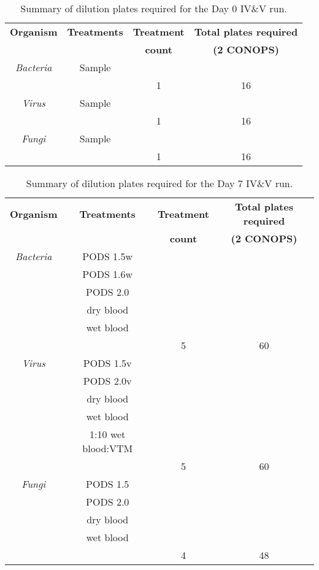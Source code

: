 \documentclass{article}
\begin{document}
\begin{table}
  \centering
  \begin{tabular}[]{c|c|c|c}
    \textbf{Organism} & \textbf{Treatments} & \textbf{Treatment} & \textbf{Total plates required} \\
     &  & \textbf{count} & \textbf{(2 CONOPS)} \\
    \hline
    \textit{Bacteria} & Sample  & & \\
    \hline
    & & 1 & 16\\
    \hline
    \textit{Virus} & Sample  & & \\
    \hline
    & & 1 & 16\\
    \hline
    \textit{Fungi} & Sample  & & \\
    \hline
    & & 1 & 16\\
    \hline

  \end{tabular}
  \caption{Summary of dilution plates required for the Day 0 IV\&V run.}
  \label{tab:dilution-plan-day-0}
\end{table}


\begin{table}
  \centering
  \begin{tabular}[]{c|c|c|c}
    \textbf{Organism} & \textbf{Treatments} & \textbf{Treatment} & \textbf{Total plates required} \\
     &  & \textbf{count} & \textbf{(2 CONOPS)} \\
    \hline
    \textit{Bacteria} & PODS 1.5w  & & \\
     & PODS 1.6w  & & \\
     & PODS 2.0  & & \\
     & dry blood  & & \\
     & wet blood  & & \\
    \hline
    & & 5 & 60\\
    \hline
    \textit{Virus} & PODS 1.5v  & & \\
     & PODS 2.0v  & & \\
     & dry blood  & & \\
     & wet blood  & & \\
             & 1:10 wet blood:VTM  & & \\
    \hline
    & & 5 & 60\\
    \hline
    \textit{Fungi} & PODS 1.5  & & \\
     & PODS 2.0  & & \\
     & dry blood  & & \\
     & wet blood  & & \\
    \hline
    & & 4 & 48\\
    \hline

  \end{tabular}
  \caption{Summary of dilution plates required for the Day 7 IV\&V run.}
  \label{tab:dilution-plan-day-7}
\end{table}
\end{document}
